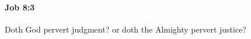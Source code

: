 
		\paragraph{Job 8:3} %
			\label{JOB-8-3}

			Doth God pervert judgment? or doth the Almighty pervert justice?



